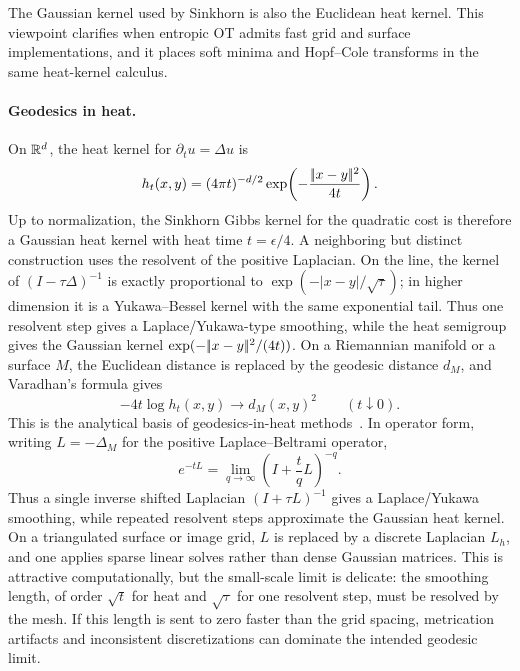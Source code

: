 The Gaussian kernel used by Sinkhorn is also the Euclidean heat kernel. This viewpoint clarifies when entropic OT admits fast grid and surface implementations, and it places soft minima and Hopf--Cole transforms in the same heat-kernel calculus.

\paragraph{Geodesics in heat.}

On $\mathbb{R}^d$, the heat kernel for $\partial_t u=\Delta u$ is
\[
	h_t(x,y)=(4\pi t)^{-d/2}\exp\!\left(-\frac{|\!| x-y |\!|^2}{4t}\right).
\]
Up to normalization, the Sinkhorn Gibbs kernel for the quadratic cost is therefore a Gaussian heat kernel with heat time $t=\epsilon/4$. A neighboring but distinct construction uses the resolvent of the positive Laplacian. On the line, the kernel of $(I-\tau\Delta)^{-1}$ is exactly proportional to $\exp(-|x-y|/\sqrt{\tau})$; in higher dimension it is a Yukawa--Bessel kernel with the same exponential tail. Thus one resolvent step gives a Laplace/Yukawa-type smoothing, while the heat semigroup gives the Gaussian kernel $\exp(-|\!| x-y |\!|^2/(4t))$. On a Riemannian manifold or a surface $M$, the Euclidean distance is replaced by the geodesic distance $d_M$, and Varadhan's formula gives
\[
	-4t\log h_t(x,y)\longrightarrow d_M(x,y)^2
	\qquad (t\downarrow0).
\]
This is the analytical basis of geodesics-in-heat methods~\cite{varadhan-1967,Crane2013}. In operator form, writing $L=-\Delta_M$ for the positive Laplace--Beltrami operator,
\[
	e^{-tL}
	=
	\lim_{q\to\infty}\left(I+\frac{t}{q}L\right)^{-q}.
\]
Thus a single inverse shifted Laplacian $(I+\tau L)^{-1}$ gives a Laplace/Yukawa smoothing, while repeated resolvent steps approximate the Gaussian heat kernel. On a triangulated surface or image grid, $L$ is replaced by a discrete Laplacian $L_h$, and one applies sparse linear solves rather than dense Gaussian matrices. This is attractive computationally, but the small-scale limit is delicate: the smoothing length, of order $\sqrt t$ for heat and $\sqrt\tau$ for one resolvent step, must be resolved by the mesh. If this length is sent to zero faster than the grid spacing, metrication artifacts and inconsistent discretizations can dominate the intended geodesic limit.

